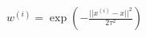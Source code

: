 \documentclass[preview]{standalone}
\begin{document}
\begin{center}
$w^{(i)} = \exp\left(-\frac{||x^{(i)} - x||^2}{2\tau^2}\right)$
\end{center}
\end{document}
